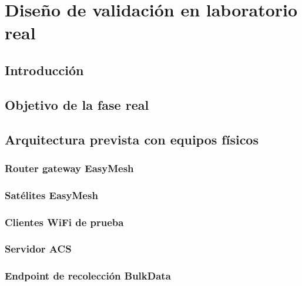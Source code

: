 %
%

\chapter{Diseño de validación en laboratorio real}
\label{cha:diseno-validacion-laboratorio-real}

\section{Introducción}
\label{sec:introduccion-validacion-laboratorio-real}


\section{Objetivo de la fase real}
\label{sec:objetivo-fase-real}


\section{Arquitectura prevista con equipos físicos}
\label{sec:arquitectura-prevista-equipos-fisicos}

\subsection{Router gateway EasyMesh}
\label{subsec:router-gateway-easymesh-real}

\subsection{Satélites EasyMesh}
\label{subsec:satelites-easymesh-real}

\subsection{Clientes WiFi de prueba}
\label{subsec:clientes-wifi-prueba}

\subsection{Servidor ACS}
\label{subsec:servidor-acs-real}

\subsection{Endpoint de recolección BulkData}
\label{subsec:endpoint-recoleccion-bulkdata-real}

